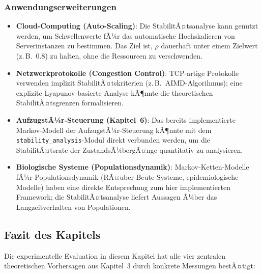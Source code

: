 ﻿\documentclass[a4paper,12pt]{scrreprt}
\theoremstyle{definition}
\begin{document}
\subsubsection{Anwendungserweiterungen}

\begin{itemize}
	\item \textbf{Cloud-Computing (Auto-Scaling)}: Die StabilitÃ¤ts\-analyse
	kann genutzt werden, um Schwellenwerte fÃ¼r das automatische
	Hochskalieren von Serverinstanzen zu bestimmen.  Das
	Ziel ist, $\rho$ dauerhaft unter einem Zielwert
	(z.\,B.\ 0.8) zu halten, ohne die Ressourcen zu
	verschwenden.
	
	\item \textbf{Netzwerkprotokolle (Congestion Control)}: TCP-artige
	Protokolle verwenden implizit StabilitÃ¤tskriterien (z.\,B.\ 
	AIMD-Algorihmus); eine explizite Lyapunov-basierte Analyse
	kÃ¶nnte die theoretischen StabilitÃ¤tsgrenzen formalisieren.
	
	\item \textbf{AufzugstÃ¼r-Steuerung (Kapitel~6)}: Das bereits
	implementierte Markov-Modell der AufzugstÃ¼r-Steuerung
	kÃ¶nnte mit dem \texttt{stability\_analysis}-Modul
	direkt verbunden werden, um die StabilitÃ¤tsrate der
	ZustandsÃ¼bergÃ¤nge quantitativ zu analysieren.
	
	\item \textbf{Biologische Systeme (Populationsdynamik)}:
	Markov-Ketten-Modelle fÃ¼r Populationsdynamik
	(RÃ¤uber-Beute-Systeme, epidemiologische Modelle) haben
	eine direkte Entsprechung zum hier implementierten Framework;
	die StabilitÃ¤tsanalyse liefert Aussagen Ã¼ber das
	Langzeitverhalten von Populationen.
\end{itemize}

\subsection{Fazit des Kapitels}
\label{subsec:fazit-kap8}

Die experimentelle Evaluation in diesem Kapitel hat alle vier
zentralen theoretischen Vorhersagen aus Kapitel~3 durch konkrete
Messungen bestÃ¤tigt:
\end{document}

